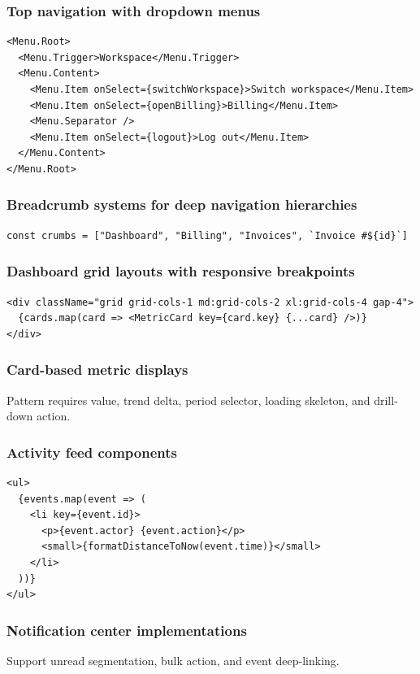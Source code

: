 \subsubsection{Top navigation with dropdown menus}
\begin{verbatim}
<Menu.Root>
  <Menu.Trigger>Workspace</Menu.Trigger>
  <Menu.Content>
    <Menu.Item onSelect={switchWorkspace}>Switch workspace</Menu.Item>
    <Menu.Item onSelect={openBilling}>Billing</Menu.Item>
    <Menu.Separator />
    <Menu.Item onSelect={logout}>Log out</Menu.Item>
  </Menu.Content>
</Menu.Root>
\end{verbatim}

\subsubsection{Breadcrumb systems for deep navigation hierarchies}
\begin{verbatim}
const crumbs = ["Dashboard", "Billing", "Invoices", `Invoice #${id}`]
\end{verbatim}

\subsubsection{Dashboard grid layouts with responsive breakpoints}
\begin{verbatim}
<div className="grid grid-cols-1 md:grid-cols-2 xl:grid-cols-4 gap-4">
  {cards.map(card => <MetricCard key={card.key} {...card} />)}
</div>
\end{verbatim}

\subsubsection{Card-based metric displays}
Pattern requires value, trend delta, period selector, loading skeleton, and drill-down action.

\subsubsection{Activity feed components}
\begin{verbatim}
<ul>
  {events.map(event => (
    <li key={event.id}>
      <p>{event.actor} {event.action}</p>
      <small>{formatDistanceToNow(event.time)}</small>
    </li>
  ))}
</ul>
\end{verbatim}

\subsubsection{Notification center implementations}
Support unread segmentation, bulk action, and event deep-linking.


